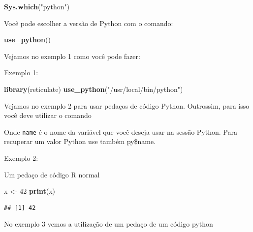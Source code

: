 \documentclass[
]{book}
\newenvironment{Shaded}{\begin{snugshade}}{\end{snugshade}}
\newcommand{\DecValTok}[1]{\textcolor[rgb]{0.00,0.00,0.81}{#1}}
\newcommand{\KeywordTok}[1]{\textcolor[rgb]{0.13,0.29,0.53}{\textbf{#1}}}
\newcommand{\NormalTok}[1]{#1}
\newcommand{\OperatorTok}[1]{\textcolor[rgb]{0.81,0.36,0.00}{\textbf{#1}}}
\newcommand{\StringTok}[1]{\textcolor[rgb]{0.31,0.60,0.02}{#1}}
\begin{document}
\begin{Shaded}
\begin{Highlighting}[]
\KeywordTok{Sys.which}\NormalTok{(}\StringTok{"python"}\NormalTok{)}
\end{Highlighting}
\end{Shaded}

Você pode escolher a versão de Python com o comando:

\begin{Shaded}
\begin{Highlighting}[]
\KeywordTok{use\_python}\NormalTok{()}
\end{Highlighting}
\end{Shaded}

Vejamos no exemplo 1 como você pode fazer:

Exemplo 1:

\begin{Shaded}
\begin{Highlighting}[]
\KeywordTok{library}\NormalTok{(reticulate)}
\KeywordTok{use\_python}\NormalTok{(}\StringTok{"/usr/local/bin/python"}\NormalTok{)}
\end{Highlighting}
\end{Shaded}

Vejamos no exemplo 2 para usar pedaços de código Python. Outrossim, para isso você deve utilizar o comando

\begin{Shaded}
\end{Shaded}

Onde \texttt{name} é o nome da variável que você deseja usar na sessão Python. Para recuperar um valor Python use também py\$name.

Exemplo 2:

Um pedaço de código R normal

\begin{Shaded}
\begin{Highlighting}[]
\NormalTok{x \textless{}{-}}\StringTok{ }\DecValTok{42}
\KeywordTok{print}\NormalTok{(x)}
\end{Highlighting}
\end{Shaded}

\begin{verbatim}
## [1] 42
\end{verbatim}

No exemplo 3 vemos a utilização de um pedaço de um código python
\end{document}

